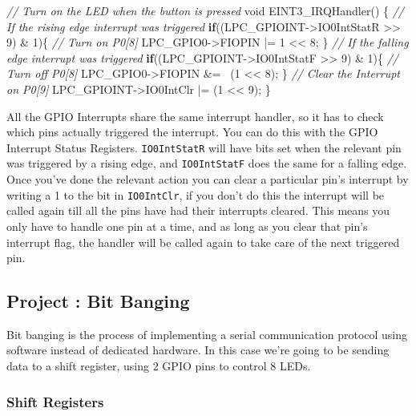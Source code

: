 \documentclass[]{article}
\newenvironment{Shaded}{\begin{snugshade}}{\end{snugshade}}
\newcommand{\KeywordTok}[1]{\textcolor[rgb]{0.13,0.29,0.53}{\textbf{{#1}}}}
\newcommand{\DataTypeTok}[1]{\textcolor[rgb]{0.13,0.29,0.53}{{#1}}}
\newcommand{\DecValTok}[1]{\textcolor[rgb]{0.00,0.00,0.81}{{#1}}}
\newcommand{\CommentTok}[1]{\textcolor[rgb]{0.56,0.35,0.01}{\textit{{#1}}}}
\newcommand{\NormalTok}[1]{{#1}}
\begin{document}
\begin{Shaded}
\begin{Highlighting}[]
    \CommentTok{// Turn on the LED when the button is pressed}
    \DataTypeTok{void} \NormalTok{EINT3_IRQHandler() \{}
        \CommentTok{// If the rising edge interrupt was triggered}
        \KeywordTok{if}\NormalTok{((LPC_GPIOINT->IO0IntStatR >> }\DecValTok{9}\NormalTok{) & }\DecValTok{1}\NormalTok{)\{}
            \CommentTok{// Turn on P0[8]}
            \NormalTok{LPC_GPIO0->FIOPIN |= }\DecValTok{1} \NormalTok{<< }\DecValTok{8}\NormalTok{;      }
        \NormalTok{\}}
        \CommentTok{// If the falling edge interrupt was triggered}
        \KeywordTok{if}\NormalTok{((LPC_GPIOINT->IO0IntStatF >> }\DecValTok{9}\NormalTok{) & }\DecValTok{1}\NormalTok{)\{}
            \CommentTok{// Turn off P0[8]}
            \NormalTok{LPC_GPIO0->FIOPIN &= ~(}\DecValTok{1} \NormalTok{<< }\DecValTok{8}\NormalTok{);      }
        \NormalTok{\}}
        \CommentTok{// Clear the Interrupt on P0[9]}
        \NormalTok{LPC_GPIOINT->IO0IntClr |= (}\DecValTok{1} \NormalTok{<< }\DecValTok{9}\NormalTok{);}
    \NormalTok{\}}
\end{Highlighting}
\end{Shaded}

All the GPIO Interrupts share the same interrupt handler, so it has to
check which pins actually triggered the interrupt. You can do this with
the GPIO Interrupt Status Registers. \texttt{IO0IntStatR} will have bits
set when the relevant pin was triggered by a rising edge, and
\texttt{IO0IntStatF} does the same for a falling edge. Once you've done
the relevant action you can clear a particular pin's interrupt by
writing a 1 to the bit in \texttt{IO0IntClr}, if you don't do this the
interrupt will be called again till all the pins have had their
interrupts cleared. This means you only have to handle one pin at a
time, and as long as you clear that pin's interrupt flag, the handler
will be called again to take care of the next triggered pin.

\subsection{Project : Bit Banging}

Bit banging is the process of implementing a serial communication
protocol using software instead of dedicated hardware. In this case
we're going to be sending data to a shift register, using 2 GPIO pins to
control 8 LEDs.

\subsubsection{Shift Registers}
\end{document}
